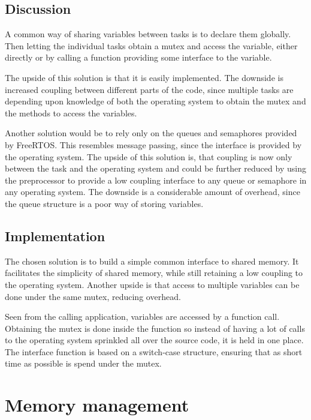 \subsection{Discussion}
A common way of sharing variables between tasks is to declare them globally.
Then letting the individual tasks obtain a mutex and access the variable, either
directly or by calling a function providing some interface to the variable.

The upside of this solution is that it is easily implemented. The downside is
increased coupling between different parts of the code, since multiple tasks are
depending upon knowledge of both the operating system to obtain the mutex and
the methods to access the variables.

Another solution would be to rely only on the queues and semaphores provided by
FreeRTOS. This resembles message passing, since the interface is provided by the
operating system. The upside of this solution is, that coupling is now only
between the task and the operating system and could be further reduced by using
the preprocessor to provide a low coupling interface to any queue or semaphore
in any operating system. The downside is a considerable amount of overhead,
since the queue structure is a poor way of storing variables.

\subsection{Implementation}
The chosen solution is to build a simple common interface to shared memory. It
facilitates the simplicity of shared memory, while still retaining a low
coupling to the operating system. Another upside is that access to multiple
variables can be done under the same mutex, reducing overhead.

Seen from the calling application, variables are accessed by a function call.
Obtaining the mutex is done inside the function so instead of having a lot of
calls to the operating system sprinkled all over the source code, it is held in
one place. The interface function is based on a switch-case structure, ensuring
that as short time as possible is spend under the mutex.


\section{Memory management}

